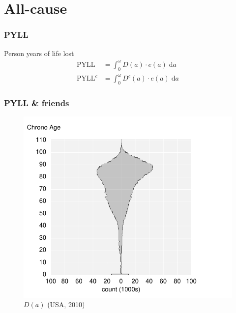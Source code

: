 \documentclass{beamer}
\newcommand{\dd}{\; \mathrm{d}}
\begin{document}
\section{All-cause}
\begin{frame}
\frametitle{PYLL}
Person years of life lost
\begin{align}
\text{PYLL} &= \int_0^\omega D(a) \cdot e(a) \dd a \\
\text{PYLL}^c &= \int_0^\omega D^c(a) \cdot e(a) \dd a
\end{align}
\end{frame}


\begin{frame}
\frametitle{PYLL \& friends}
\vspace{-1cm}
\begin{figure}[b]
    \centering
    \includegraphics[scale=.7]{Figures/f1_Da.pdf}
    \caption{$D(a)$ (USA, 2010)}
\end{figure} 
\end{frame}
\end{document}
